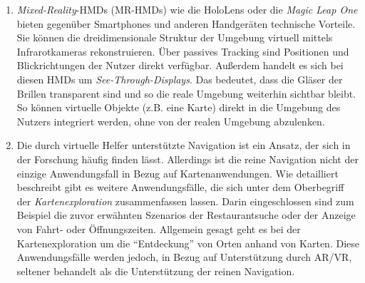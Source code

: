 \begin{enumerate}
\item \emph{Mixed-Reality}-HMDs (MR-HMDs) wie die HoloLens oder die \emph{Magic Leap One} \parencite{MagicLeap2018} bieten gegenüber Smartphones und anderen Handgeräten technische Vorteile.
Sie können die dreidimensionale Struktur der Umgebung virtuell mittels Infrarotkameras rekonstruieren.
Über passives Tracking sind Positionen und Blickrichtungen der Nutzer direkt verfügbar.
Außerdem handelt es sich bei diesen HMDs um \emph{See-Through-Displays}.
Das bedeutet, dass die Gläser der Brillen transparent sind und so die reale Umgebung weiterhin sichtbar bleibt.
So können virtuelle Objekte (z.B. eine Karte) direkt in die Umgebung des Nutzers integriert werden, ohne von der realen Umgebung abzulenken.

\item Die durch virtuelle Helfer unterstützte Navigation ist ein Ansatz, der sich in der Forschung häufig finden lässt.
Allerdings ist die reine Navigation nicht der einzige Anwendungsfall in Bezug auf Kartenanwendungen.
Wie \textcite{Reichenbacher2001} detailliert beschreibt gibt es weitere Anwendungsfälle, die sich unter dem Oberbegriff der \emph{Kartenexploration} zusammenfassen lassen.
Darin eingeschlossen sind zum Beispiel die zuvor erwähnten Szenarios der Restaurantsuche oder der Anzeige von Fahrt- oder Öffnungszeiten.
Allgemein gesagt geht es bei der Kartenexploration um die \enquote{Entdeckung} von Orten anhand von Karten.
Diese Anwendungsfälle werden jedoch, in Bezug auf Unterstützung durch AR/VR, seltener behandelt als die Unterstützung der reinen Navigation.
\end{enumerate}

